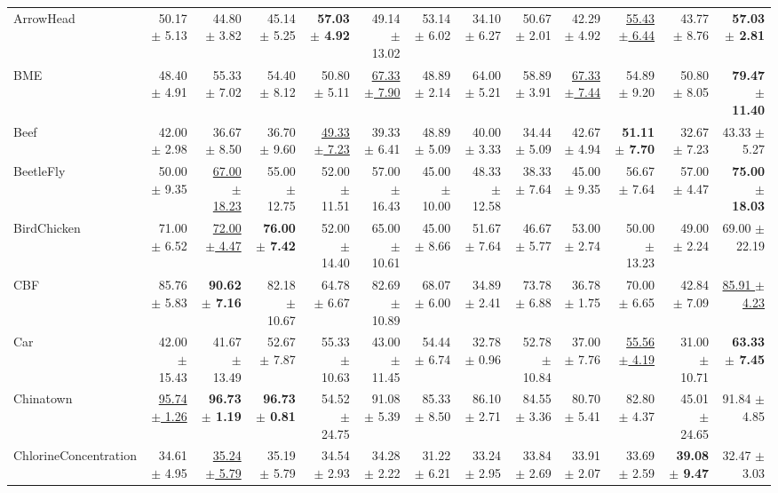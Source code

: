 \begin{landscape}
\begin{longtable}{lrrrrrrrrrrrr}
ArrowHead & 50.17 $\pm$ 5.13 & 44.80 $\pm$ 3.82 & 45.14 $\pm$ 5.25 & \textbf{57.03 $\pm$ 4.92} & 49.14 $\pm$ 13.02 & 53.14 $\pm$ 6.02 & 34.10 $\pm$ 6.27 & 50.67 $\pm$ 2.01 & 42.29 $\pm$ 4.92 & \underline{55.43 $\pm$ 6.44} & 43.77 $\pm$ 8.76 & \textbf{57.03 $\pm$ 2.81} \\
BME & 48.40 $\pm$ 4.91 & 55.33 $\pm$ 7.02 & 54.40 $\pm$ 8.12 & 50.80 $\pm$ 5.11 & \underline{67.33 $\pm$ 7.90} & 48.89 $\pm$ 2.14 & 64.00 $\pm$ 5.21 & 58.89 $\pm$ 3.91 & \underline{67.33 $\pm$ 7.44} & 54.89 $\pm$ 9.20 & 50.80 $\pm$ 8.05 & \textbf{79.47 $\pm$ 11.40} \\
Beef & 42.00 $\pm$ 2.98 & 36.67 $\pm$ 8.50 & 36.70 $\pm$ 9.60 & \underline{49.33 $\pm$ 7.23} & 39.33 $\pm$ 6.41 & 48.89 $\pm$ 5.09 & 40.00 $\pm$ 3.33 & 34.44 $\pm$ 5.09 & 42.67 $\pm$ 4.94 & \textbf{51.11 $\pm$ 7.70} & 32.67 $\pm$ 7.23 & 43.33 $\pm$ 5.27 \\
BeetleFly & 50.00 $\pm$ 9.35 & \underline{67.00 $\pm$ 18.23} & 55.00 $\pm$ 12.75 & 52.00 $\pm$ 11.51 & 57.00 $\pm$ 16.43 & 45.00 $\pm$ 10.00 & 48.33 $\pm$ 12.58 & 38.33 $\pm$ 7.64 & 45.00 $\pm$ 9.35 & 56.67 $\pm$ 7.64 & 57.00 $\pm$ 4.47 & \textbf{75.00 $\pm$ 18.03} \\
BirdChicken & 71.00 $\pm$ 6.52 & \underline{72.00 $\pm$ 4.47} & \textbf{76.00 $\pm$ 7.42} & 52.00 $\pm$ 14.40 & 65.00 $\pm$ 10.61 & 45.00 $\pm$ 8.66 & 51.67 $\pm$ 7.64 & 46.67 $\pm$ 5.77 & 53.00 $\pm$ 2.74 & 50.00 $\pm$ 13.23 & 49.00 $\pm$ 2.24 & 69.00 $\pm$ 22.19 \\
CBF & 85.76 $\pm$ 5.83 & \textbf{90.62 $\pm$ 7.16} & 82.18 $\pm$ 10.67 & 64.78 $\pm$ 6.67 & 82.69 $\pm$ 10.89 & 68.07 $\pm$ 6.00 & 34.89 $\pm$ 2.41 & 73.78 $\pm$ 6.88 & 36.78 $\pm$ 1.75 & 70.00 $\pm$ 6.65 & 42.84 $\pm$ 7.09 & \underline{85.91 $\pm$ 4.23} \\
Car & 42.00 $\pm$ 15.43 & 41.67 $\pm$ 13.49 & 52.67 $\pm$ 7.87 & 55.33 $\pm$ 10.63 & 43.00 $\pm$ 11.45 & 54.44 $\pm$ 6.74 & 32.78 $\pm$ 0.96 & 52.78 $\pm$ 10.84 & 37.00 $\pm$ 7.76 & \underline{55.56 $\pm$ 4.19} & 31.00 $\pm$ 10.71 & \textbf{63.33 $\pm$ 7.45} \\
Chinatown & \underline{95.74 $\pm$ 1.26} & \textbf{96.73 $\pm$ 1.19} & \textbf{96.73 $\pm$ 0.81} & 54.52 $\pm$ 24.75 & 91.08 $\pm$ 5.39 & 85.33 $\pm$ 8.50 & 86.10 $\pm$ 2.71 & 84.55 $\pm$ 3.36 & 80.70 $\pm$ 5.41 & 82.80 $\pm$ 4.37 & 45.01 $\pm$ 24.65 & 91.84 $\pm$ 4.85 \\
ChlorineConcentration & 34.61 $\pm$ 4.95 & \underline{35.24 $\pm$ 5.79} & 35.19 $\pm$ 5.79 & 34.54 $\pm$ 2.93 & 34.28 $\pm$ 2.22 & 31.22 $\pm$ 6.21 & 33.24 $\pm$ 2.95 & 33.84 $\pm$ 2.69 & 33.91 $\pm$ 2.07 & 33.69 $\pm$ 2.59 & \textbf{39.08 $\pm$ 9.47} & 32.47 $\pm$ 3.03 \\

\end{longtable}
\end{landscape}
